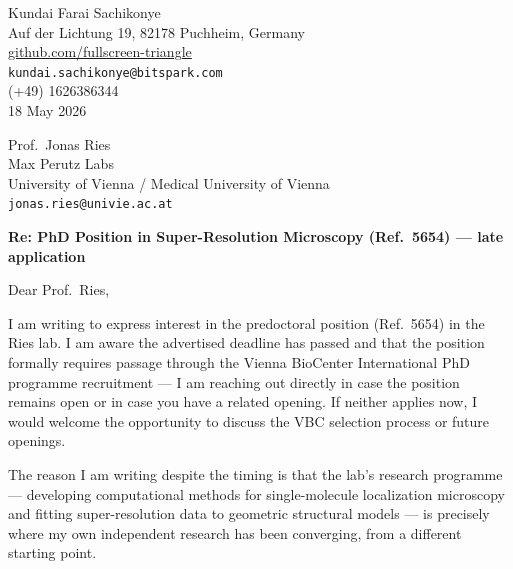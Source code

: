 \documentclass[12pt,a4paper]{article}
\begin{document}
\begin{flushright}
Kundai Farai Sachikonye \\
Auf der Lichtung 19, 82178 Puchheim, Germany \\
\href{https://github.com/fullscreen-triangle}{github.com/fullscreen-triangle} \\
\texttt{kundai.sachikonye@bitspark.com} \\
(+49) 1626386344 \\[6pt]
18 May 2026
\end{flushright}

\vspace{1em}

Prof.\ Jonas Ries \\
Max Perutz Labs \\
University of Vienna / Medical University of Vienna \\
\texttt{jonas.ries@univie.ac.at}

\vspace{1.5em}

\textbf{Re: PhD Position in Super-Resolution Microscopy (Ref.\ 5654) --- late application}

\vspace{1em}

Dear Prof.\ Ries,

I am writing to express interest in the predoctoral position (Ref.\ 5654) in the
Ries lab. I am aware the advertised deadline has passed and that the position
formally requires passage through the Vienna BioCenter International PhD programme
recruitment --- I am reaching out directly in case the position remains open or in
case you have a related opening. If neither applies now, I would welcome the
opportunity to discuss the VBC selection process or future openings.

The reason I am writing despite the timing is that the lab's research programme ---
developing computational methods for single-molecule localization microscopy
and fitting super-resolution data to geometric structural models --- is precisely
where my own independent research has been converging, from a different starting
point.
\end{document}
